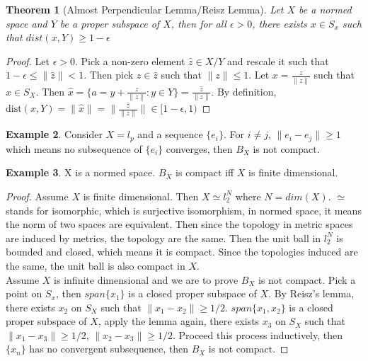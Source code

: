 \documentclass[a4paper, 11pt]{article}
\newcommand{\dist}{\text{dist}}
\newtheorem{theorem}{Theorem}[section]
\theoremstyle{definition}
\newtheorem{example}[theorem]{Example}
\begin{document}
\begin{theorem}[Almost Perpendicular Lemma/Reisz Lemma]
    Let $X$ be a normed space and $Y$ be a proper subspace of $X$, then for all $\epsilon>0$, there exists $x\in S_x$ such that $dist(x,Y)\ge 1-\epsilon$
\end{theorem}
\begin{proof}
    Let $\epsilon>0$. Pick a non-zero element $\hat z \in X/Y$ and rescale it such that $1-\epsilon\le\|\hat z\|<1$. Then pick $z \in \hat z$ such that $\|z\|\le 1$. 
    Let $x = \frac{z}{\|z\|}$ such that $x\in S_X$. Then $\hat x=\{a=y+\frac{z}{\|z\|}:y\in Y\}=\frac{\hat z}{\|z\|}$. By definition, $\dist(x,Y)=\|\hat x\|=\|\frac{\hat z}{\|z\|}\|\in[1-\epsilon, 1)$
\end{proof}
\begin{example}
    Consider $X=l_p$ and a sequence $\{e_i\}$. For $i \neq j$, $\|e_i-e_j\|\ge 1$ which means no subsequence of $\{e_i\}$ converges, then $B_X$ is not compact.
\end{example}
\begin{example}
    X is a normed space. $B_X$ is compact iff $X$ is finite dimensional.
    \begin{proof}
        Assume $X$ is finite dimensional. Then $X \simeq l_2^N$ where $N=dim(X)$. $\simeq$ stands for isomorphic, which is surjective isomorphism, in normed space, it means
        the norm of two spaces are equivalent. Then since the topology in metric spaces are induced by metrics, the topology are the same. Then the unit ball in $l_2^N$ is 
        bounded and closed, which means it is compact. Since the topologies induced are the same, the unit ball is also compact in $X$.\\
        Assume $X$ is infinite dimensional and we are to prove $B_X$ is not compact. Pick a point on $S_x$, then $span\{x_1\}$ is a closed proper subspace of $X$. By Reisz's lemma, 
        there exists $x_2$ on $S_X$ such that $\|x_1-x_2\|\ge 1/2$. $span\{x_1, x_2\}$ is a closed proper subspace of $X$, apply the lemma again, there exists $x_3$ on $S_X$
        such that $\|x_1-x_3\|\ge 1/2$, $\|x_2 - x_3\|\ge 1/2$. Proceed this process inductively, then $\{x_n\}$ has no convergent subsequence, then $B_X$ is not compact.
    \end{proof}
\end{example}
\end{document}
